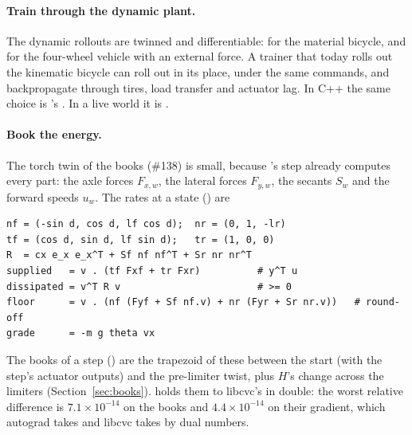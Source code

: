 \documentclass[11pt]{article}
\theoremstyle{remark}
\begin{document}
\paragraph{Train through the dynamic plant.} The dynamic rollouts are twinned and differentiable:
 for the material bicycle, and  for the
four-wheel vehicle with an external force. A trainer that today rolls out the kinematic bicycle can
roll out  in its place, under the same  commands, and
backpropagate through tires, load transfer and actuator lag. In C++ the same choice is
's . In a live world it is
.

\paragraph{Book the energy.} The torch twin of the books (\#138) is small, because
's step already computes every part: the axle forces $F_{x,w}$, the lateral forces
$F_{y,w}$, the secants $S_w$ and the forward speeds $u_w$. The rates at a state
() are
\begin{center}
\begin{minipage}{0.86\linewidth}
\small
\begin{verbatim}
nf = (-sin d, cos d, lf cos d);  nr = (0, 1, -lr)
tf = (cos d, sin d, lf sin d);   tr = (1, 0, 0)
R  = cx e_x e_x^T + Sf nf nf^T + Sr nr nr^T
supplied   = v . (tf Fxf + tr Fxr)          # y^T u
dissipated = v^T R v                        # >= 0
floor      = v . (nf (Fyf + Sf nf.v) + nr (Fyr + Sr nr.v))   # round-off
grade      = -m g theta vx
\end{verbatim}
\end{minipage}
\end{center}
The books of a step () are the trapezoid of these between the start (with
the step's actuator outputs) and the pre-limiter twist, plus $H$'s change across the limiters
(Section~\ref{sec:books}).  holds them to libcvc's
 in double: the worst relative difference is $7.1\times10^{-14}$ on the
books and $4.4\times10^{-14}$ on their gradient, which autograd takes and libcvc takes by dual
numbers.
\end{document}
